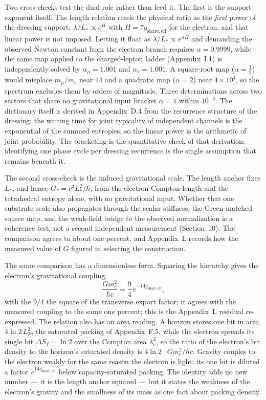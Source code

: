 \documentclass[11pt]{article}
\begin{document}
Two cross-checks test the dual role rather than feed it. The first is the support exponent itself. The length relation reads the physical ratio as the \emph{first} power of the dressing support, $\lambda/L_*\propto e^{H}$ with $H=7g_{\mathrm{share,eff}}$ for the electron, and that linear power is not imposed. Letting it float as $\lambda/L_*\propto e^{\alpha H}$ and demanding the observed Newton constant from the electron branch requires $\alpha=0.9999$, while the same map applied to the charged-lepton ladder (Appendix~I.1) is independently solved by $\alpha_\mu=1.001$ and $\alpha_\tau=1.001$. A square-root map ($\alpha=\tfrac12$) would misplace $m_\mu/m_e$ near $14$ and a quadratic map ($\alpha=2$) near $4\times10^{4}$, so the spectrum excludes them by orders of magnitude. Three determinations across two sectors that share no gravitational input bracket $\alpha=1$ within $10^{-3}$. The dictionary itself is derived in Appendix~D.4 from the recurrence structure of the dressing: the waiting time for joint typicality of independent channels is the exponential of the summed entropies, so the linear power is the arithmetic of joint probability. The bracketing is the quantitative check of that derivation; identifying one phase cycle per dressing recurrence is the single assumption that remains beneath it.

The second cross-check is the induced gravitational scale. The length anchor fixes $L_*$, and hence $G_*=c^3L_*^2/\hbar$, from the electron Compton length and the tetrahedral entropy alone, with no gravitational input. Whether that one substrate scale also propagates through the scalar stiffness, the Green-matched source map, and the weak-field bridge to the observed normalization is a coherence test, not a second independent measurement (Section~10). The comparison agrees to about one percent, and Appendix~L records how the measured value of $G$ figured in selecting the construction.

The same comparison has a dimensionless form. Squaring the hierarchy gives the electron's gravitational coupling,
\[
\frac{Gm_e^2}{\hbar c}=\frac94\,e^{-14g_{\mathrm{share,eff}}},
\]
with the $9/4$ the square of the transverse export factor; it agrees with the measured coupling to the same one percent; this is the Appendix~L residual re-expressed. The relation also has an area reading. A horizon stores one bit in area $4\ln2\,L_P^2$, the saturated packing of Appendix~F.5, while the electron spreads its single bit $\Delta S_f=\ln2$ over the Compton area $\lambda_e^2$, so the ratio of the electron's bit density to the horizon's saturated density is $4\ln2\,\cdot Gm_e^2/\hbar c$. Gravity couples to the electron weakly for the same reason the electron is light: its one bit is diluted a factor $e^{14g_{\mathrm{share,eff}}}$ below capacity-saturated packing. The identity adds no new number --- it is the length anchor squared --- but it states the weakness of the electron's gravity and the smallness of its mass as one fact about packing density.
\end{document}
